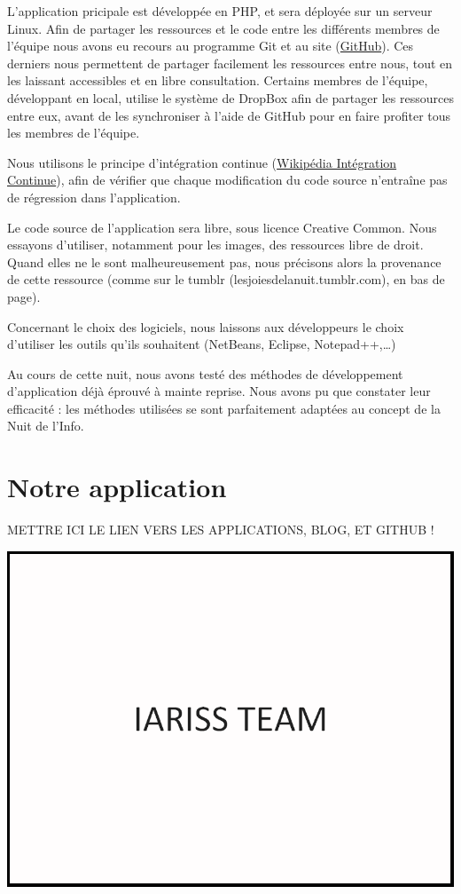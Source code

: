 \documentclass[12pt, a4paper]{article}
\newcommand{\espace}{\vspace{.8cm}}
\begin{document}
L'application pricipale est développée en PHP, et sera déployée sur un serveur Linux. Afin de partager les ressources et le code entre les différents membres de l'équipe nous avons eu recours au programme Git et au site (\href{https://github.com/}{GitHub}). Ces derniers nous permettent de partager facilement les ressources entre nous, tout en les laissant accessibles et en libre consultation.
Certains membres de l'équipe, développant en local, utilise le système de DropBox afin de partager les ressources entre eux, avant de les synchroniser à l'aide de GitHub pour en faire profiter tous les membres de l'équipe.

Nous utilisons le principe d'intégration continue (\href{http://fr.wikipedia.org/wiki/Int\%C3\%A9gration_continue}{Wikipédia Intégration Continue}), afin de vérifier que chaque modification du code source n'entraîne pas de régression dans l'application.

Le code source de l'application sera libre, sous licence Creative Common. Nous essayons d'utiliser, notamment pour les images, des ressources libre de droit. Quand elles ne le sont malheureusement pas, nous précisons alors la provenance de cette ressource (comme sur le tumblr (lesjoiesdelanuit.tumblr.com), en bas de page).

Concernant le choix des logiciels, nous laissons aux développeurs le choix d'utiliser les outils qu'ils souhaitent (NetBeans, Eclipse, Notepad++,\ldots{})

Au cours de cette nuit, nous avons testé des méthodes de développement d'application déjà éprouvé à mainte reprise. Nous avons pu que constater leur efficacité : les méthodes utilisées se sont parfaitement adaptées au concept de la Nuit de l'Info.

\espace{}
\section*{Notre application}
METTRE ICI LE LIEN VERS LES APPLICATIONS, BLOG, ET GITHUB !
\espace{}
\begin{center}
\includegraphics[width=.9\textwidth, keepaspectratio=true]{img/test.png}
\end{center}
\end{document}

